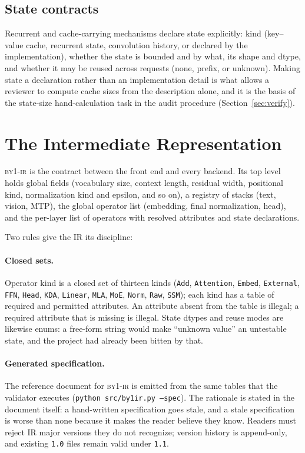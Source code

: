\documentclass[11pt,a4paper]{article}
\newcommand{\code}[1]{\texttt{#1}}
\newcommand{\ir}{\textsc{by1-ir}}
\newcommand{\q}[1]{\textquotedblleft #1\textquotedblright}
\begin{document}
\subsection{State contracts}

Recurrent and cache-carrying mechanisms declare state explicitly: kind
(key--value cache, recurrent state, convolution history, or declared by the
implementation), whether the state is bounded and by what, its shape and
dtype, and whether it may be reused across requests (none, prefix, or
unknown). Making state a declaration rather than an implementation detail is
what allows a reviewer to compute cache sizes from the description alone, and
it is the basis of the state-size hand-calculation task in the audit procedure
(Section~\ref{sec:verify}).

\section{The Intermediate Representation}
\label{sec:ir}

\ir{} is the contract between the front end and every backend. Its top level
holds global fields (vocabulary size, context length, residual width,
positional kind, normalization kind and epsilon, and so on), a registry of
stacks (text, vision, MTP), the global operator list (embedding, final
normalization, head), and the per-layer list of operators with resolved
attributes and state declarations.

Two rules give the IR its discipline:

\paragraph{Closed sets.} Operator kind is a closed set of thirteen kinds
(\code{Add}, \code{Attention}, \code{Embed}, \code{External}, \code{FFN},
\code{Head}, \code{KDA}, \code{Linear}, \code{MLA}, \code{MoE}, \code{Norm},
\code{Raw}, \code{SSM}); each kind has a table of required and permitted
attributes. An attribute absent from the table is illegal; a required
attribute that is missing is illegal. State dtypes and reuse modes are
likewise enums: a free-form string would make \q{unknown value} an untestable
state, and the project had already been bitten by that.

\paragraph{Generated specification.} The reference document for \ir{} is
emitted from the same tables that the validator executes
(\code{python src/by1ir.py --spec}). The rationale is stated in the document
itself: a hand-written specification goes stale, and a stale specification is
worse than none because it makes the reader believe they know. Readers must
reject IR major versions they do not recognize; version history is
append-only, and existing \code{1.0} files remain valid under \code{1.1}.
\end{document}
